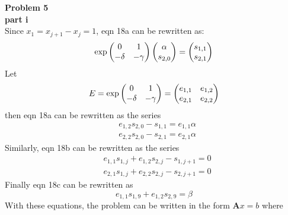 \documentclass{article} %
\begin{document}
\textbf{Problem 5} \\
\textbf{part i} \\
Since $x_1 = x_{j+1} - x_j = 1$, eqn 18a can be rewritten as:
\begin{equation*}
\hbox{exp}\begin{pmatrix} 0 & 1 \\ -\delta & -\gamma \end{pmatrix} \begin{pmatrix} \alpha\\ s_{2,0} \end{pmatrix} = \begin{pmatrix} s_{1,1} \\ s_{2,1} \end{pmatrix}
\end{equation*}
Let 
\begin{equation*}
E = \hbox{exp}\begin{pmatrix} 0 & 1 \\ -\delta & -\gamma \end{pmatrix} = \begin{pmatrix} e_{1,1} & e_{1,2} \\ e_{2,1} & e_{2,2} \end{pmatrix} 
\end{equation*}
then eqn 18a can be rewritten as the series
\begin{align*}
& e_{1,2} s_{2,0} - s_{1,1} = e_{1,1} \alpha \\
& e_{2,2} s_{2,0} - s_{2,1} = e_{2,1} \alpha
\end{align*}
Similarly, eqn 18b can be rewritten as the series
\begin{align*}
& e_{1,1} s_{1,j} + e_{1,2} s_{2,j} - s_{1, j+1} = 0 \\
& e_{2,1} s_{1,j} + e_{2,2} s_{2,j} - s_{2, j+1} = 0
\end{align*}
Finally eqn 18c can be rewritten as 
\begin{equation*}
e_{1,1} s_{1,9} + e_{1,2} s_{2,9} = \beta
\end{equation*}
With these equations, the problem can be written in the form $\boldsymbol{A}x = b$ where 
\end{document}

